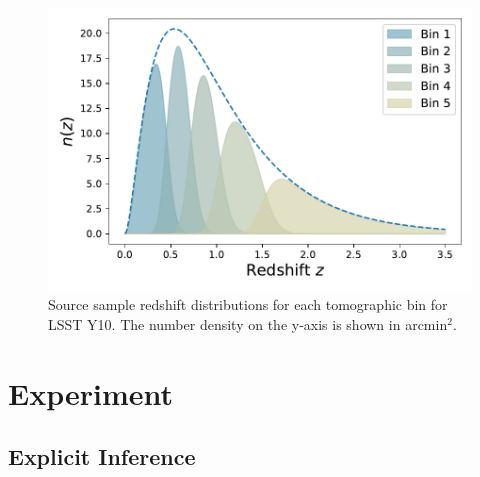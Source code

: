 \documentclass{aa}
\begin{document}
\begin{figure}
    \centering
    \includegraphics[width=\columnwidth]{figures/redshift_distribution_light.pdf}
    \caption{
     Source sample redshift distributions for each tomographic bin for LSST Y10. The number density on the y-axis is shown in arcmin$^2$.
    }
     \label{fig:redshift_distribution}
\end{figure}
\section{Experiment}\label{Sec:experiment}
\subsection{Explicit Inference}
\end{document}
